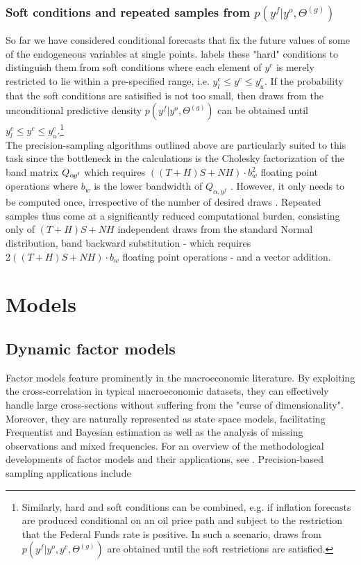 \documentclass[notitlepage,a4paper,12pt]{article}
\begin{document}
\subsubsection{Soft conditions and repeated samples from $p(y^f|y^o, \Theta^{(g)})$}

So far we have considered conditional forecasts that fix the future values of some of the endogeneous variables at single points. \citet{waggonerzha1999_res} labels these "hard" conditions to distinguish them from soft conditions where each element of $y^c$ is merely restricted to lie within a pre-specified range, i.e. $y^c_l \leq y^c \leq y^c_u$. If the probability that the soft conditions are satisified is not too small, then draws from the unconditional predictive density $p(y^f|y^o, \Theta^{(g)})$ can be obtained until $y^c_l \leq y^c \leq y^c_u$.\footnote{Similarly, hard and soft conditions can be combined, e.g. if inflation forecasts are produced conditional on an oil price path and subject to the restriction that the Federal Funds rate is positive. In such a scenario, draws from $p(y^f|y^o, y^c, \Theta^{(g)})$ are obtained until the soft restrictions are satisfied.}\\

The precision-sampling algorithms outlined above are particularly suited to this task since the bottleneck in the calculations is the Cholesky factorization of the band matrix $Q_{\alpha\!y^{\sf{f}}}$ which requires $((T+H)S+NH)\cdot b_w^2$ floating point operations where $b_w$ is the lower bandwidth of $Q_{\alpha, y^f}$ \citep[][4.3.5]{GolubvanLoan2013}. However, it only needs to be computed once, irrespective of the number of desired draws \citep{rue2001_jrss}. Repeated samples thus come at a significantly reduced computational burden, consisting only of $(T+H)S+NH$ independent draws from the standard Normal distribution, band backward substitution - which requires $2 ((T+H)S+NH) \cdot b_w$ floating point operations \citep[][4.3.2]{GolubvanLoan2013}- and a vector addition.  

\section{Models}\label{sec:models}

\subsection{Dynamic factor models}\label{sec:dfm}

Factor models feature prominently in the macroeconomic literature. By exploiting the cross-correlation in typical macroeconomic datasets, they can effectively handle large cross-sections without suffering from the "curse of dimensionality". Moreover, they are naturally represented as state space models, facilitating Frequentist and Bayesian estimation as well as the analysis of missing observations and mixed frequencies. For an overview of the methodological developments of factor models and their applications, see \citet{stockwatson2016_hbmacro}. Precision-based sampling applications include \citet{chanjeliazkov_2009,mccausland_factor2015,kaufmannschumacher_jae2017,kaufmannschumacher_jectrcs2019}\\
\end{document}
